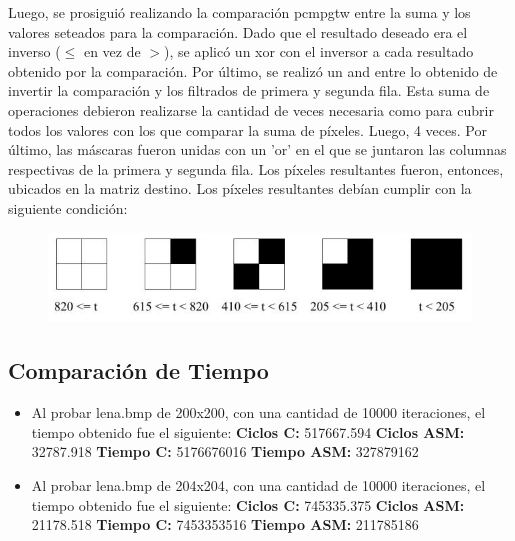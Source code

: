 \documentclass[10pt, a4paper]{article}
\begin{document}
\begin{itemize}
Luego, se prosiguió realizando la comparación pcmpgtw entre la suma y los valores seteados para la comparación. Dado que el resultado deseado era el inverso ($\leq$ en vez de $>$), se aplicó un xor con el inversor a cada resultado obtenido por la comparación. Por último, se realizó un and entre lo obtenido de invertir la comparación y los filtrados de primera y segunda fila. Esta suma de operaciones debieron realizarse la cantidad de veces necesaria como para cubrir todos los valores con los que comparar la suma de píxeles. Luego, 4 veces. Por último, las máscaras fueron unidas con un 'or' en el que se juntaron las columnas respectivas de la primera y segunda fila. Los píxeles resultantes fueron, entonces, ubicados en la matriz destino.\newline
Los píxeles resultantes debían cumplir con la siguiente condición:
\begin{figure}[H] %
\begin{center}
\includegraphics[width=400pt]{./halftone.jpg}
\end{center}
\end{figure}

\subsection{Comparación de Tiempo}

\begin{itemize}
\item{Al probar lena.bmp de 200x200, con una cantidad de 10000 iteraciones, el tiempo obtenido fue el siguiente:\newline
\newline
\textbf{Ciclos C:}                  517667.594\newline
\vspace{0.15cm}
\textbf{Ciclos ASM:}               32787.918\newline
\textbf{Tiempo C:}                 5176676016\newline
\textbf{Tiempo ASM:}               327879162\newline}

\item{Al probar lena.bmp de 204x204, con una cantidad de 10000 iteraciones, el tiempo obtenido fue el siguiente:\newline
\newline
\textbf{Ciclos C:}                 745335.375\newline
\vspace{0.15cm}
\textbf{Ciclos ASM:}               21178.518\newline
\textbf{Tiempo C:}                 7453353516\newline
\textbf{Tiempo ASM:}               211785186\newline}



\end{itemize}
\end{itemize}
\end{document}
